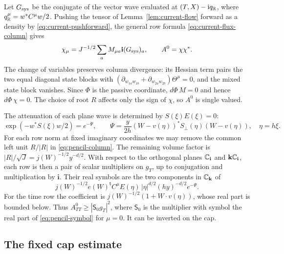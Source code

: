 Let $G_{\rm sys}$ be the conjugate of the vector wave evaluated at
$(T,X)-\mathrm i q_{\mathbb R}$, where $q_{\mathbb R}^\mu=w^*C^\mu w/2$.
Pushing the tensor of Lemma~\ref{lem:current-flow} forward as a density
by \eqref{eq:current-pushforward}, the general row formula
\eqref{eq:current-flux-column} gives
\begin{equation}\label{eq:pencil-column}
 \chi_\mu=J^{-1/2}\sum_a M_{\mu a}\mathbf i(G_{\rm sys})_a,\qquad
 A^0=\chi\chi^* .
\end{equation}
The change of variables preserves column divergence: its Hessian term
pairs the two equal diagonal state blocks with
$(\partial_{w_{1a}w_{1b}}+\partial_{w_{2a}w_{2b}})\Theta^\mu=0$,
and the mixed state block vanishes. Since $\Phi$ is the passive
coordinate, $d\Phi\,M=0$ and hence $d\Phi\,\chi=0$. The choice of root
$R$ affects only the sign of $\chi$, so $A^0$ is single valued.

The attenuation of each plane wave is determined by $S(\xi)E(\xi)=0$:
\begin{equation}\label{eq:pencil-gaussian}
 \exp(-w^*S(\xi)w/2)=e^{-\Psi},\qquad
 \Psi=\frac{y}{2h}(W-v(\eta))^*S_\perp(\eta)(W-v(\eta)),\quad \eta=h\xi .
\end{equation}
For each row norm at fixed imaginary coordinates we may remove the common
left unit $R/|R|$ in \eqref{eq:pencil-column}. The remaining volume factor
is $|R|/\sqrt J=j(W)^{-1/2}y^{-d/2}$. With respect to the orthogonal planes
$\mathbb C_{\mathbf i}$ and $\mathbf k\mathbb C_{\mathbf i}$, each row is then a
pair of scalar multipliers on $g_T$, up to conjugation and multiplication
by $\mathbf i$. Their real symbols are the two components in $\mathbb C_{\mathbf k}$ of
\begin{equation}\label{eq:pencil-symbol}
 j(W)^{-1/2}e(W)^{\mathsf t}C^\mu E(\eta)\,
             |\eta|^{d/2}(hy)^{-d/2} e^{-\Psi}.
\end{equation}
For the time row the coefficient is $j(W)^{-1/2}(1+W\cdot v(\eta))$,
whose real part is bounded below. Thus $A^0_{TT}\ge|\mathsf S_0 g_T|^2$,
where $\mathsf S_0$ is the multiplier with symbol the real part of
\eqref{eq:pencil-symbol} for $\mu=0$. It can be inverted on the cap.

\subsection{The fixed cap estimate}

